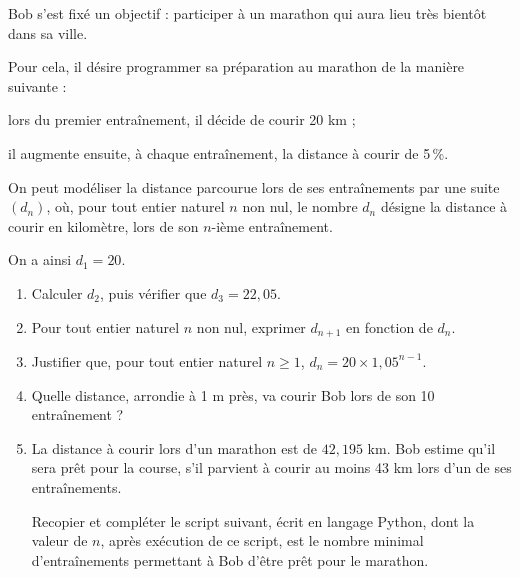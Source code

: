 \bigskip

Bob s'est fixé un objectif : participer à un marathon qui aura lieu très bientôt dans sa ville.

Pour cela, il désire programmer sa préparation au marathon de la manière suivante :

\begin{list}{\textbullet}{}
\item lors du premier entraînement, il décide de courir 20 km ;
\item il augmente ensuite, à chaque entraînement, la distance à courir de 5\,\%.
\end{list}

On peut modéliser la distance parcourue lors de ses entraînements par une suite $(d_n)$, où, pour tout entier naturel $n$ non nul, le nombre $d_n$ désigne la distance à courir en kilomètre, lors de son $n$-ième entraînement.

On a ainsi $d_1 = 20$.

\begin{enumerate}
\item Calculer $d_2$, puis vérifier que $d_3=22,05$.
\item Pour tout entier naturel $n$ non nul, exprimer $d_{n+1}$ en fonction de $d_n$.
\item Justifier que, pour tout entier naturel $n \geqslant 1$, $d_n= 20\times 1,05^{n-1}$.
\item Quelle distance, arrondie à 1 m près, va courir Bob lors de son 10\ieme{} entraînement ?
\item La distance à courir lors d'un marathon est de $42,195$ km. Bob estime qu'il sera prêt pour la
course, s'il parvient à courir au moins 43 km lors d'un de ses entraînements.

Recopier et compléter le script suivant, écrit en langage Python, dont la valeur de $n$, après exécution de ce script, est le nombre minimal d'entraînements permettant à Bob d'être prêt pour le marathon.


\begin{center}
\end{center}

\end{enumerate}
